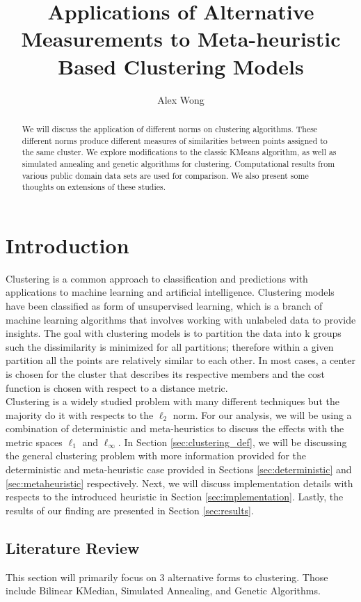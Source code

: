 \documentclass[a4paper,12pt]{article}
\title{Applications of Alternative Measurements to Meta-heuristic Based Clustering Models}
\author{Alex Wong}
\numberwithin{equation}{section}
\begin{document}
\maketitle
\begin{abstract}
We will discuss the application of different norms on clustering algorithms.  These different norms produce different measures of similarities between points assigned to the same cluster.  We explore modifications to the classic KMeans algorithm, as well as simulated annealing and genetic algorithms for clustering.  Computational results from various public domain data sets are used for comparison.  We also present some thoughts on extensions of these studies.
\end{abstract}
\section{Introduction}
Clustering is a common approach to classification and predictions with applications to machine learning and artificial intelligence. Clustering models have been classified as form of unsupervised learning, which is a branch of machine learning algorithms that involves working with unlabeled data to provide insights. The goal with clustering models is to partition the data into k groups such the dissimilarity is minimized for all partitions; therefore within a given partition all the points are relatively similar to each other. In most cases, a center is chosen for the cluster that describes its respective members and the cost function is chosen with respect to a distance metric.\\

Clustering is a widely studied problem with many different techniques but the majority do it with respects to the $\ell_2$ norm. For our analysis, we will be using a combination of deterministic and meta-heuristics to discuss the effects with the metric spaces $\ell_1$ and $\ell_\infty$. In Section \ref{sec:clustering_def}, we will be discussing the general clustering problem with more information provided for the deterministic and meta-heuristic case provided in Sections \ref{sec:deterministic} and \ref{sec:metaheuristic} respectively. Next, we will discuss implementation details with respects to the introduced heuristic in Section \ref{sec:implementation}. Lastly, the results of our finding are presented in Section \ref{sec:results}.

\subsection{Literature Review}
This section will primarily focus on 3 alternative forms to clustering. Those include Bilinear KMedian, Simulated Annealing, and Genetic Algorithms.\\ 
\end{document}
